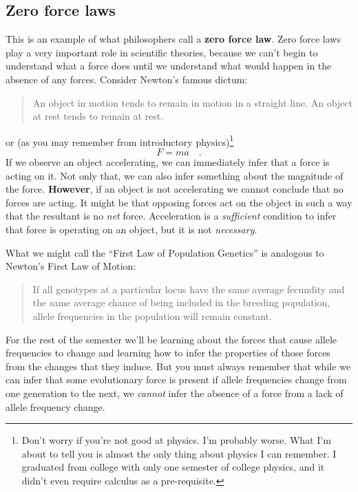 \documentclass[12pt]{article}
\begin{document}
\subsection*{Zero force laws}

This is an example of what philosophers call a {\bf zero force
law}. Zero force laws play a very important role in scientific
theories, because we can't begin to understand what a force does until
we understand what would happen in the absence of any forces. Consider
Newton's famous dictum: 
\begin{quotation}
\noindent An object in motion tends to remain in motion in a straight
line. An object at rest tends to remain at rest.
\end{quotation}
or (as you may remember from introductory physics)\footnote{Don't
  worry if you're not good at physics. I'm probably worse. What I'm
  about to tell you is almost the only thing about physics I can
  remember. I graduated from college with only one semester of college
  physics, and it didn't even require calculus as a pre-requisite.}
\[
F = ma \quad.
\]
\noindent If we observe an object accelerating, we can immediately
infer that a force is acting on it. Not only that, we can also infer
something about the magnitude of the force.  {\bf However}, if an
object is not accelerating we cannot conclude that no forces are
acting. It might be that opposing forces act on the object in such a
way that the resultant is no {\it net\/} force. Acceleration is a {\it
  sufficient\/} condition to infer that force is operating on an
object, but it is not {\it necessary}.

What we might call the ``First Law of Population Genetics'' is
analogous to Newton's First Law of Motion:
\begin{quotation}
\noindent If all genotypes at a particular locus have the same average
fecundity and the same average chance of being included in the breeding
population, allele frequencies in the population will remain constant.
\end{quotation}
For the rest of the semester we'll be learning about the forces that
cause allele frequencies to change and learning how to infer the
properties of those forces from the changes that they induce. But you
must always remember that while we can infer that some evolutionary
force is present if allele frequencies change from one generation to
the next, we {\it cannot\/} infer the absence of a force from a lack
of allele frequency change.






\ccLicense
\end{document}

